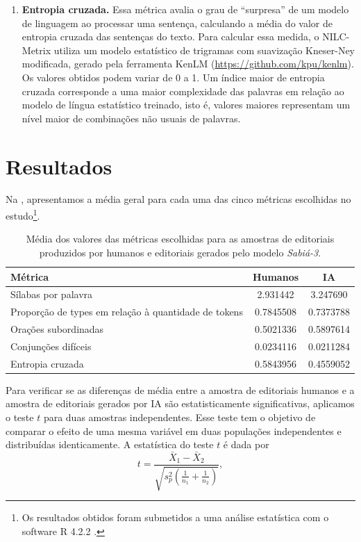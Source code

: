 \documentclass[portuguese]{textolivre}
\begin{document}
\begin{enumerate}[label=\Roman*.]
    \item \textbf{Entropia cruzada.} Essa métrica avalia o grau de ``surpresa'' de um modelo de linguagem ao processar uma sentença, calculando a média do valor de entropia cruzada das sentenças do texto. Para calcular essa medida, o NILC-Metrix utiliza um modelo estatístico de trigramas com suavização Kneser-Ney modificada, gerado pela ferramenta KenLM (\url{https://github.com/kpu/kenlm}). Os valores obtidos podem variar de 0 a 1. Um índice maior de entropia cruzada corresponde a uma maior complexidade das palavras em relação ao modelo de língua estatístico treinado, isto é, valores maiores representam um nível maior de combinações não usuais de palavras.
\end{enumerate}




\section{Resultados}\label{sec-resultados}
Na , apresentamos a média geral para cada uma das cinco métricas escolhidas no estudo\footnote{Os resultados obtidos foram submetidos a uma análise estatística com o software R 4.2.2 \cite{R2021}.}.

\begin{table}[htpb]
\centering
\begin{threeparttable}
\caption{Média dos valores das métricas escolhidas para as amostras de editoriais produzidos por humanos e editoriais gerados pelo modelo \emph{Sabiá-3}.}
\label{tbl-tabela-01}
\begin{tabular}{lcc}
\toprule 
Métrica & Humanos & IA \\ 
\midrule
  Sílabas por palavra & 2.931442 & 3.247690 \\
  Proporção de types em relação à quantidade de tokens & 0.7845508 & 0.7373788 \\
  Orações subordinadas & 0.5021336 & 0.5897614 \\ 
  Conjunções difíceis & 0.0234116 & 0.0211284 \\
  Entropia cruzada & 0.5843956 & 0.4559052 \\
\bottomrule
\end{tabular}
\end{threeparttable}
\end{table}

Para verificar se as diferenças de média entre a amostra de editoriais humanos e a amostra de editoriais gerados por IA são estatisticamente significativas, aplicamos o teste $t$ para duas amostras independentes.
Esse teste tem o objetivo de comparar o efeito de uma mesma variável em duas populações independentes e distribuídas identicamente.
A estatística do teste $t$ é dada por
\begin{equation}
  t = \frac{\bar{X}_1 - \bar{X}_2}{\sqrt{s_p^2 \left( \frac{1}{n_1} + \frac{1}{n_2} \right) }} ,
  \label{eq-teste_t}
\end{equation}
\end{document}
